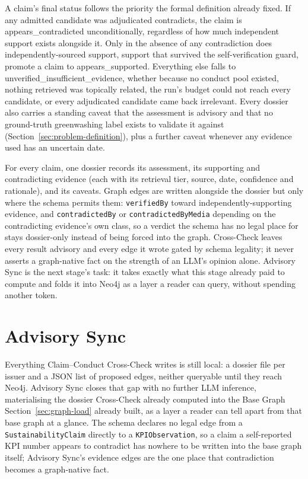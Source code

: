 \documentclass[fontsize=12pt,oneside,headings=small]{scrreprt}
\begin{document}
A claim's final status follows the priority the formal definition already fixed. If any admitted candidate was adjudicated \textsf{contradicts}, the claim is \textsf{appears\_contradicted} unconditionally, regardless of how much independent support exists alongside it. Only in the absence of any contradiction does independently-sourced support, support that survived the self-verification guard, promote a claim to \textsf{appears\_supported}. Everything else falls to \textsf{unverified\_insufficient\_evidence}, whether because no conduct pool existed, nothing retrieved was topically related, the run's budget could not reach every candidate, or every adjudicated candidate came back \textsf{irrelevant}. Every dossier also carries a standing caveat that the assessment is advisory and that no ground-truth greenwashing label exists to validate it against (Section~\ref{sec:problem-definition}), plus a further caveat whenever any evidence used has an uncertain date.

For every claim, one dossier records its assessment, its supporting and contradicting evidence (each with its retrieval tier, source, date, confidence and rationale), and its caveats. Graph edges are written alongside the dossier but only where the schema permits them: \texttt{verifiedBy} toward independently-supporting evidence, and \texttt{contradictedBy} or \texttt{contradictedByMedia} depending on the contradicting evidence's own class, so a verdict the schema has no legal place for stays dossier-only instead of being forced into the graph. Cross-Check leaves every result advisory and every edge it wrote gated by schema legality; it never asserts a graph-native fact on the strength of an LLM's opinion alone. Advisory Sync is the next stage's task: it takes exactly what this stage already paid to compute and folds it into Neo4j as a layer a reader can query, without spending another token.

\section{Advisory Sync}
\label{sec:advisory-sync}

Everything Claim--Conduct Cross-Check writes is still local: a dossier file per issuer and a JSON list of proposed edges, neither queryable until they reach Neo4j. Advisory Sync closes that gap with no further LLM inference, materialising the dossier Cross-Check already computed into the Base Graph Section~\ref{sec:graph-load} already built, as a layer a reader can tell apart from that base graph at a glance. The schema declares no legal edge from a \texttt{SustainabilityClaim} directly to a \texttt{KPIObservation}, so a claim a self-reported KPI number appears to contradict has nowhere to be written into the base graph itself; Advisory Sync's evidence edges are the one place that contradiction becomes a graph-native fact.
\end{document}
